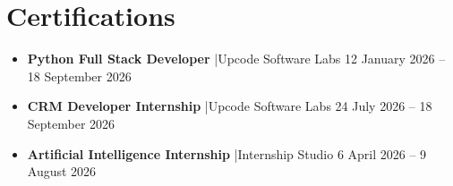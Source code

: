 \documentclass[a4paper,9pt]{article}
\begin{document}
\section*{Certifications}
\begin{itemize}
    \item \textbf{Python Full Stack Developer} \enspace|\enspace Upcode Software Labs \hfill 12 January 2026 -- 18 September 2026
    \item \textbf{CRM Developer Internship} \enspace|\enspace Upcode Software Labs \hfill 24 July 2026 -- 18 September 2026
    \item \textbf{Artificial Intelligence Internship} \enspace|\enspace Internship Studio \hfill 6 April 2026 -- 9 August 2026
\end{itemize}
\end{document}
